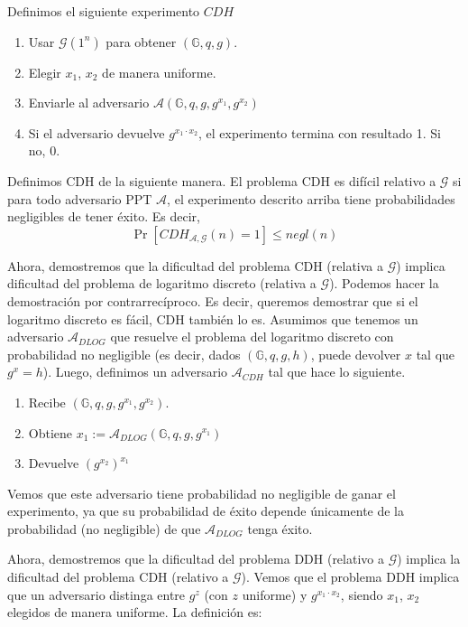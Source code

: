 \documentclass[12pt,addpoints,answers]{exam}
\begin{document}
\begin{questions}
\begin{solution}
  Definimos el siguiente experimento $CDH$
  \begin{enumerate}
    \item Usar $\mathcal{G}(1^n)$ para obtener $(\mathbb{G}, q, g)$. 
    \item Elegir $x_1$, $x_2$ de manera uniforme. 
    \item Enviarle al adversario $\mathscr{A}(\mathbb{G}, q, g, g^{x_1}, g^{x_2})$ 
    \item Si el adversario devuelve $g^{x_1 \cdot x_2}$, el experimento termina con resultado 1. Si no, 0. 
  \end{enumerate}

  Definimos CDH de la siguiente manera. El problema CDH es difícil relativo a $\mathcal{G}$ si para todo adversario PPT $\mathscr{A}$, el experimento descrito arriba tiene probabilidades negligibles de tener éxito. Es decir,
  $$\Pr[CDH_{\mathscr{A}, \mathcal{G}}(n) = 1] \leq negl(n)$$

  Ahora, demostremos que la dificultad del problema CDH (relativa a $\mathcal{G}$) implica dificultad del problema de logaritmo discreto (relativa a $\mathcal{G}$). Podemos hacer la demostración por contrarrecíproco. Es decir, queremos demostrar que si el logaritmo discreto es fácil, CDH también lo es. 
Asumimos que tenemos un adversario $\mathscr{A}_{DLOG}$ que resuelve el problema del logaritmo discreto con probabilidad no negligible (es decir, dados $(\mathbb{G}, q, g, h)$, puede devolver $x$ tal que $g^x = h$). 
  Luego, definimos un adversario $\mathscr{A}_{CDH}$ tal que hace lo siguiente. 
  \begin{enumerate}
    \item Recibe $(\mathbb{G}, q, g, g^{x_1}, g^{x_2})$. 
    \item Obtiene $x_1 := \mathscr{A}_{DLOG}(\mathbb{G}, q, g, g^{x_1})$
    \item Devuelve $(g^{x_2})^{x_1}$
  \end{enumerate}

  Vemos que este adversario tiene probabilidad no negligible de ganar el experimento, ya que su probabilidad de éxito depende únicamente de la probabilidad (no negligible) de que $\mathscr{A}_{DLOG}$ tenga éxito. 



  Ahora, demostremos que la dificultad del problema DDH (relativo a $\mathcal{G}$) implica la dificultad del problema CDH (relativo a $\mathcal{G}$). 
  Vemos que el problema DDH implica que un adversario distinga entre $g^z$ (con $z$ uniforme) y $g^{x_1 \cdot x_2}$, siendo $x_1$, $x_2$ elegidos de manera uniforme. La definición es:


\end{solution}
\end{questions}
\end{document}
